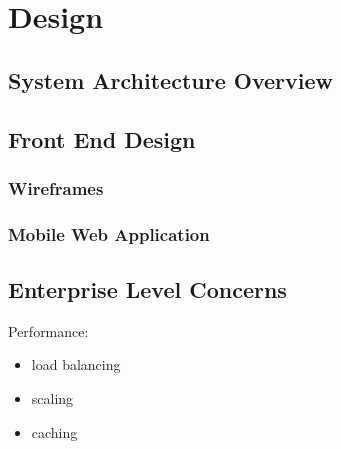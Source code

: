 \section{Design}
\label{sec:design}
\subsection{System Architecture Overview}
\subsection{Front End Design}
\subsubsection{Wireframes}
\subsubsection{Mobile Web Application}
\subsection{Enterprise Level Concerns}
Performance:

\begin{itemize}
	\item load balancing
	\item scaling
	\item caching
\end{itemize}
